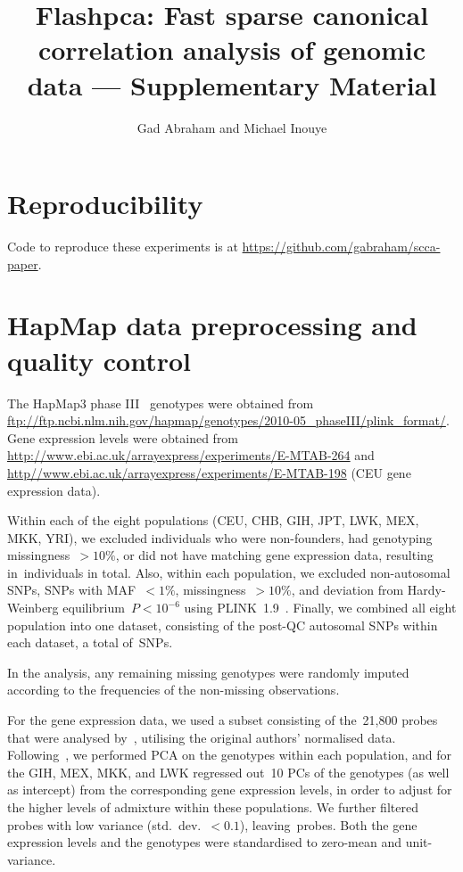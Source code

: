\documentclass[a4paper,10pt]{article}
\author{Gad Abraham and Michael Inouye}
\title{Flashpca: Fast sparse canonical correlation analysis of genomic data
--- Supplementary Material}
\begin{document}
\maketitle

\section{Reproducibility}

Code to reproduce these experiments is at
\url{https://github.com/gabraham/scca-paper}.

\section{HapMap data preprocessing and quality control}

The HapMap3 phase III~\citep{hapmap2010} genotypes were obtained from
\url{ftp://ftp.ncbi.nlm.nih.gov/hapmap/genotypes/2010-05_phaseIII/plink_format/}.
Gene expression levels were obtained from
\url{http://www.ebi.ac.uk/arrayexpress/experiments/E-MTAB-264} and
\url{http//www.ebi.ac.uk/arrayexpress/experiments/E-MTAB-198} (CEU gene
expression data).

Within each of the eight populations (CEU, CHB, GIH, JPT, LWK, MEX, MKK,
YRI), we excluded individuals who were non-founders, had genotyping
missingness~${>}10\%$, or did not have matching gene expression data,
resulting in~\nindiv individuals in total. Also, within each population, we
excluded non-autosomal SNPs, SNPs with MAF~${<}1\%$, missingness~${>}10\%$,
and deviation from Hardy-Weinberg equilibrium~$P{<}10^{-6}$ using
PLINK~1.9~\citep{purcell2007,Chang2015}.  Finally, we combined all eight
population into one dataset, consisting of the post-QC autosomal SNPs within
each dataset, a total of~\nsnps SNPs.

In the analysis, any remaining missing genotypes were randomly imputed
according to the frequencies of the non-missing observations.

For the gene expression data, we used a subset consisting of the~21,800 probes
that were analysed by~\citep{Stranger2012}, utilising the original authors'
normalised data. Following~\citep{Stranger2012}, we performed PCA on the
genotypes within each population, and for the GIH, MEX, MKK, and LWK regressed
out~10 PCs of the genotypes (as well as intercept) from the corresponding gene
expression levels, in order to adjust for the higher levels of admixture within
these populations.  We further filtered probes with low variance
(std.~dev.~${<}0.1$), leaving~\ngenes probes. Both the gene expression levels and
the genotypes were standardised to zero-mean and unit-variance.
\end{document}
